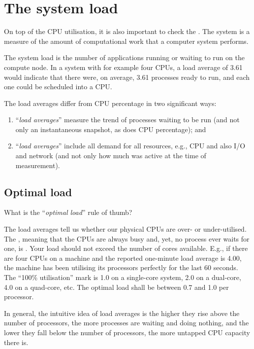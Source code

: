 \section{The system load}

On top of the CPU utilisation, it is also important to check the .  The system  is a measure of the amount of computational
work that a computer system performs.

The system load is the number of applications running or waiting to run on the
compute node.  In a system with for example four CPUs, a load average of 3.61
would indicate that there were, on average, 3.61 processes ready to run, and
each one could be scheduled into a CPU.

The load averages differ from CPU percentage in two significant ways:

\begin{enumerate}
\item  ``\emph{load averages}'' measure the trend of processes waiting to be run (and not only an instantaneous snapshot, as does CPU percentage); and
\item  ``\emph{load averages}'' include all demand for all resources, e.g., CPU and also I/O and network (and not only how much was active at the time of measurement).
\end{enumerate}

\subsection{Optimal load}

What is the ``\emph{optimal load}'' rule of thumb?

The load averages tell us whether our physical CPUs are over- or
under-utilised. The , meaning that the
CPUs are always busy and, yet, no process ever waits for one, is .  Your load should not exceed the number
of cores available.  E.g., if there are four CPUs on a machine and the reported
one-minute load average is 4.00, the machine has been utilising its processors
perfectly for the last 60 seconds. The ``100\% utilisation'' mark is 1.0 on a
single-core system, 2.0 on a dual-core, 4.0 on a quad-core, etc. The optimal
load shall be between 0.7 and 1.0 per processor.

In general, the intuitive idea of load averages is the higher they rise above
the number of processors, the more processes are waiting and doing nothing, and the lower
they fall below the number of processors, the more untapped CPU capacity there
is.

